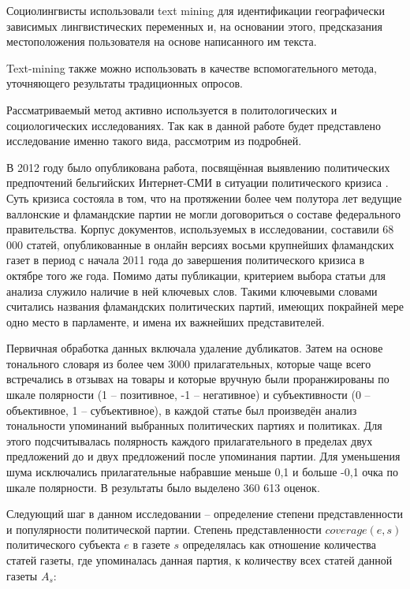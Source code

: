 Социолингвисты использовали text mining для идентификации географически зависимых лингвистических переменных и, на основании этого, предсказания местоположения пользователя на основе написанного им текста\cite{geographic_lexical_variation}.

Text-mining также можно использовать в качестве вспомогательного метода, уточняющего результаты традиционных опросов\cite{tweets_to_polls}.

Рассматриваемый метод активно используется в политологических и социологических исследованиях. Так как в данной работе будет представлено исследование именно такого вида, рассмотрим из подробней.

В 2012 году было опубликована работа, посвящённая выявлению политических предпочтений бельгийских Интернет-СМИ в ситуации политического кризиса \cite{MediaCoverage2012}. Суть кризиса состояла в том, что на протяжении более чем полутора лет ведущие валлонские и фламандские партии не могли договориться о составе федерального правительства. Корпус документов, используемых в исследовании, составили 68 000 статей, опубликованные в онлайн версиях восьми крупнейших фламандских газет в период с начала 2011 года до завершения политического кризиса в октябре того же года. Помимо даты публикации, критерием выбора статьи для анализа служило наличие в ней ключевых слов. Такими ключевыми словами считались названия фламандских политических партий, имеющих покрайней мере одно место в парламенте, и имена их важнейших представителей.

Первичная обработка данных включала удаление дубликатов. Затем на основе тонального словаря из более чем 3000 прилагательных, которые чаще всего встречались в отзывах на товары и которые вручную были проранжированы по шкале полярности (1 -- позитивное, -1 -- негативное) и субъективности (0 -- объективное, 1 -- субъективное), в каждой статье был произведён анализ тональности упоминаний выбранных  политических партиях и политиках. Для этого подсчитывалась полярность каждого прилагательного в пределах двух предложений до и двух предложений после упоминания партии. Для уменьшения шума исключались прилагательные набравшие меньше 0,1 и больше -0,1 очка по шкале полярности. В результаты было выделено 360 613 оценок.

Следующий шаг в данном исследовании -- определение степени представленности и популярности политической партии. Степень представленности $coverage(e, s)$ политического субъекта $e$ в газете $s$ определялась как отношение количества статей газеты, где упоминалась данная партия, к количеству всех статей данной газеты $A_{s}$:

